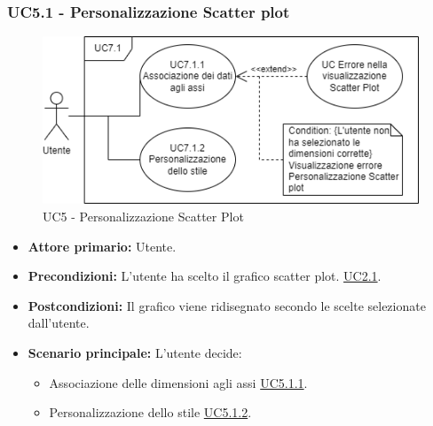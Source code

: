 \subsubsection{UC5.1 - Personalizzazione Scatter plot}
\label{sec:UC5.1}
\begin{figure}[h!]
	\centering
	\includegraphics[scale=0.55]{../../assets/personalizzazioneScatterPlot.drawio.png}
	\caption{UC5 - Personalizzazione Scatter Plot}
\end{figure}
\begin{itemize}
    \item \textbf{Attore primario:} Utente.
	\item \textbf{Precondizioni:} L'utente ha scelto il grafico scatter plot. \hyperref[sec:UC2.1]{UC2.1}.
	\item \textbf{Postcondizioni:} 
	Il grafico viene ridisegnato secondo le scelte selezionate dall'utente.
	\item \textbf{Scenario principale:} L'utente decide:
	\begin{itemize}
        \item Associazione delle dimensioni agli assi \hyperref[sec:UC5.1.1]{UC5.1.1}.
        \item Personalizzazione dello stile \hyperref[sec:UC5.1.2]{UC5.1.2}.
    \end{itemize}
\end{itemize}
